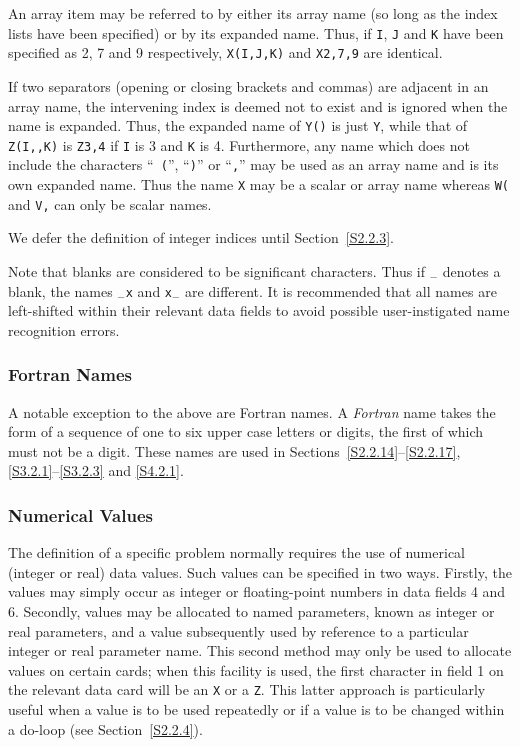 \documentclass[a4paper]{article}
\begin{document}
An array
item may be referred to by either its array  name
(so long as  the index lists have  been specified) or by its  expanded
name.
Thus, if {\tt I}, {\tt J} and {\tt K} have been specified as 2,
7 and 9 respectively, {\tt X(I,J,K)} and {\tt X2,7,9} are identical.

If  two separators  (opening  or   closing brackets and  commas)   are
adjacent  in an array  name,
the intervening index   is deemed not  to
exist and is  ignored when the  name is expanded.
Thus, the expanded name of {\tt Y()}  is just {\tt Y},  while  that of
{\tt   Z(I,,K)} is {\tt  Z3,4}  if {\tt I}   is 3 and  {\tt K}  is  4.
Furthermore, any  name which   does not  include  the characters ``{\tt
(}'', ``{\tt )}'' or ``{\tt ,}'' may  be used as an array  name
and is its own expanded name.
Thus the name {\tt X} may be a scalar or array
name whereas {\tt W(} and {\tt V,} can only be scalar names.

We defer the definition of integer indices until Section~\ref{S2.2.3}.

Note that blanks
are considered to be significant characters.  Thus if
$_{-}$ denotes a blank, the names $_{-}${\tt x}  and {\tt x}$_{-}$ are
different. It  is recommended that all  names are  left-shifted within
their  relevant data fields
to avoid possible user-instigated name recognition errors.

\subsubsection{\label{S2.1.2}Fortran Names}

A  notable exception  to the above are Fortran  names. A {\em Fortran}
name takes the form of a sequence of one to six upper case  letters or
digits, the first  of which  must not be a  digit. These names are used in
Sections~\ref{S2.2.14}--\ref{S2.2.17}, \ref{S3.2.1}--\ref{S3.2.3} and
\ref{S4.2.1}.

\subsubsection{\label{S2.1.3}Numerical Values}

The  definition of   a specific problem  normally requires  the use of
numerical (integer or real) data values. Such values  can be specified
in  two  ways.  Firstly,  the values  may  simply occur  as integer or
floating-point numbers in data fields
4 and 6. Secondly, values may be
allocated to named  parameters,
known as  integer or real  parameters,
and a value subsequently used by reference to a particular integer or
real parameter name.  This second method may only  be used to allocate
values   on  certain cards;
when  this  facility  is used,  the first
character in field 1 on the  relevant  data card
will  be an {\tt X} or a {\tt Z}.
This latter approach is particularly useful  when a value is
to be used repeatedly or if a value is to be  changed within a do-loop
(see Section~\ref{S2.2.4}).
\end{document}
